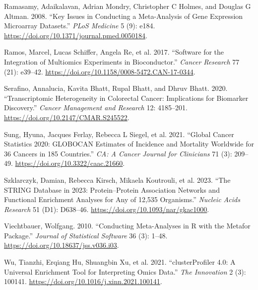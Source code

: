 \documentclass[
  12pt,
]{article}
\newlength{\cslhangindent}
\newenvironment{CSLReferences}[2] %
 {\begin{list}{}{%
  \setlength{\itemindent}{0pt}
  \setlength{\leftmargin}{0pt}
  \setlength{\parsep}{0pt}
  \ifodd #1
   \setlength{\leftmargin}{\cslhangindent}
   \setlength{\itemindent}{-1\cslhangindent}
  \fi
  \setlength{\itemsep}{#2\baselineskip}}}
 {\end{list}}
\begin{document}
\begin{CSLReferences}{1}{1}
Ramasamy, Adaikalavan, Adrian Mondry, Christopher C Holmes, and Douglas
G Altman. 2008. {``Key Issues in Conducting a Meta-Analysis of Gene
Expression Microarray Datasets.''} \emph{PLoS Medicine} 5 (9): e184.
\url{https://doi.org/10.1371/journal.pmed.0050184}.

Ramos, Marcel, Lucas Schiffer, Angela Re, et al. 2017. {``Software for
the Integration of Multiomics Experiments in {Bioconductor}.''}
\emph{Cancer Research} 77 (21): e39--42.
\url{https://doi.org/10.1158/0008-5472.CAN-17-0344}.

Serafino, Annalucia, Kavita Bhatt, Rupal Bhatt, and Dhruv Bhatt. 2020.
{``Transcriptomic Heterogeneity in Colorectal Cancer: Implications for
Biomarker Discovery.''} \emph{Cancer Management and Research} 12:
4185--201. \url{https://doi.org/10.2147/CMAR.S245522}.

Sung, Hyuna, Jacques Ferlay, Rebecca L Siegel, et al. 2021. {``Global
Cancer Statistics 2020: {GLOBOCAN} Estimates of Incidence and Mortality
Worldwide for 36 Cancers in 185 Countries.''} \emph{CA: A Cancer Journal
for Clinicians} 71 (3): 209--49.
\url{https://doi.org/10.3322/caac.21660}.

Szklarczyk, Damian, Rebecca Kirsch, Mikaela Koutrouli, et al. 2023.
{``The {STRING} Database in 2023: Protein--Protein Association Networks
and Functional Enrichment Analyses for Any of 12,535 Organisms.''}
\emph{Nucleic Acids Research} 51 (D1): D638--46.
\url{https://doi.org/10.1093/nar/gkac1000}.

Viechtbauer, Wolfgang. 2010. {``Conducting Meta-Analyses in {R} with the
Metafor Package.''} \emph{Journal of Statistical Software} 36 (3):
1--48. \url{https://doi.org/10.18637/jss.v036.i03}.

Wu, Tianzhi, Erqiang Hu, Shuangbin Xu, et al. 2021. {``{clusterProfiler}
4.0: {A} Universal Enrichment Tool for Interpreting Omics Data.''}
\emph{The Innovation} 2 (3): 100141.
\url{https://doi.org/10.1016/j.xinn.2021.100141}.

\end{CSLReferences}
\end{document}
